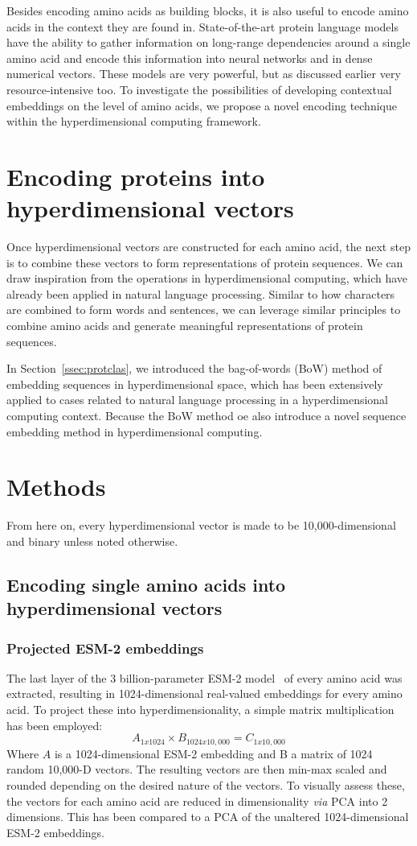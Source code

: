 Besides encoding amino acids as building blocks, it is also useful to encode amino acids in the context they are found in. State-of-the-art protein language models have the ability to gather information on long-range dependencies around a single amino acid and encode this information into neural networks and in dense numerical vectors. These models are very powerful, but as discussed earlier very resource-intensive too. To investigate the possibilities of developing contextual embeddings on the level of amino acids, we propose a novel encoding technique within the hyperdimensional computing framework.

\section{Encoding proteins into hyperdimensional vectors}
Once hyperdimensional vectors are constructed for each amino acid, the next step is to combine these vectors to form representations of protein sequences. We can draw inspiration from the operations in hyperdimensional computing, which have already been applied in natural language processing. Similar to how characters are combined to form words and sentences, we can leverage similar principles to combine amino acids and generate meaningful representations of protein sequences.

In Section~\ref{ssec:protclas}, we introduced the bag-of-words (BoW) method of embedding sequences in hyperdimensional space, which has been extensively applied to cases related to natural language processing in a hyperdimensional computing context. Because the BoW method oe also introduce a novel sequence embedding method in hyperdimensional computing.

\section{Methods}
From here on, every hyperdimensional vector is made to be 10,000-dimensional and binary unless noted otherwise. 
\subsection{Encoding single amino acids into hyperdimensional vectors}
\subsubsection*{Projected ESM-2 embeddings}
The last layer of the 3 billion-parameter ESM-2 model~\cite{esm2} of every amino acid was extracted, resulting in 1024-dimensional real-valued embeddings for every amino acid. To project these into hyperdimensionality, a simple matrix multiplication has been employed: 
\[A_{1x1024} \times B_{1024x10,000} = C_{1x10,000}\]
Where $A$ is a 1024-dimensional ESM-2 embedding and B a matrix of 1024 random 10,000-D vectors. The resulting vectors are then min-max scaled and rounded depending on the desired nature of the vectors. To visually assess these, the vectors for each amino acid are reduced in dimensionality \textit{via} PCA into 2 dimensions. This has been compared to a PCA of the unaltered 1024-dimensional ESM-2 embeddings.
